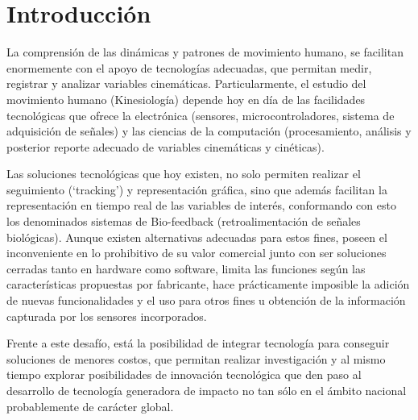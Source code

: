 \documentclass[12pt,a4paper]{article}
\begin{document}
\thispagestyle{empty}
\tableofcontents %
\thispagestyle{empty}
\listoffigures
\thispagestyle{empty}
\listoftables

\thispagestyle{empty}
\pagebreak
\setcounter{page}{1}

\let\stdsection\section
\renewcommand\section{\newpage\stdsection}



\section{Introducción}
La comprensión de las dinámicas y patrones de movimiento humano, se facilitan enormemente con el apoyo de tecnologías adecuadas, que permitan medir, registrar y analizar variables cinemáticas. Particularmente, el estudio del movimiento humano (Kinesiología) depende hoy en día de las facilidades tecnológicas que ofrece la electrónica (sensores, microcontroladores, sistema de adquisición de señales) y las ciencias de la computación (procesamiento, análisis y posterior reporte adecuado de  variables cinemáticas y cinéticas).  

Las soluciones tecnológicas que hoy existen, no solo permiten realizar el seguimiento (‘tracking’) y representación gráfica, sino que además facilitan la representación en tiempo real de las variables de interés, conformando con esto los denominados sistemas de Bio-feedback (retroalimentación de señales biológicas). Aunque existen alternativas adecuadas para estos fines, poseen el inconveniente en lo prohibitivo de su valor comercial junto con ser soluciones cerradas tanto en hardware como software, limita las funciones según las características propuestas por fabricante, hace prácticamente imposible la adición de nuevas funcionalidades y el uso para otros fines u obtención de la información capturada por los sensores incorporados.

Frente a este desafío, está la posibilidad de integrar tecnología para conseguir soluciones de menores costos, que permitan realizar investigación y al mismo tiempo explorar posibilidades de innovación tecnológica que den paso al desarrollo de tecnología generadora de impacto no tan sólo en el ámbito nacional probablemente de carácter global.
\end{document}
